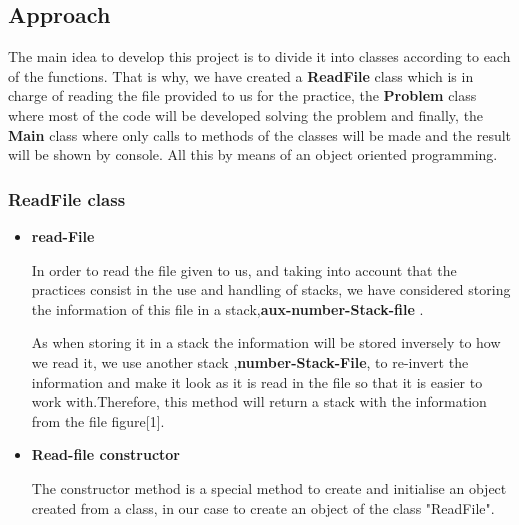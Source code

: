 \documentclass[a4paper]{article}
\theoremstyle{plain}
\theoremstyle{definition}
\begin{document}
     \subsection{Approach}
        The main idea to develop this project is to divide it into classes according to each of the functions. That is why, we have created a \textbf{ReadFile} class which is in charge of reading the file provided to us for the practice, the \textbf{Problem} class where most of the code will be developed solving the problem and finally, the \textbf{Main} class where only calls to methods of the classes will be made and the result will be shown by console. All this by means of an object oriented programming.


        \subsubsection{ReadFile class}
        \begin{itemize}
            \item \textbf{read-File}\par
            In order to read the file given to us, and taking into account that the practices consist in the use and handling of stacks, we have considered storing the information of this file in a stack,\textbf{aux-number-Stack-file }.

             As when storing it in a stack the information will be stored inversely to how we read it, we use another stack ,\textbf{number-Stack-File}, to re-invert the information and make it look as it is read in the file so that it is easier to work with.Therefore, this method will return a stack with the information from the file figure[1].\newline
             \item \textbf{Read-file constructor}\par
           The constructor method is a special method to create and initialise an object created from a class, in our case to create an object of the class "ReadFile".
        \end{itemize}
        
\end{document}
